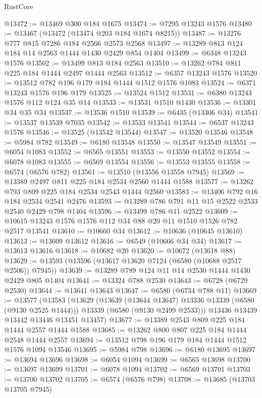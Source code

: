 \begin{lexlean}{RustCore}
\begin{coremodule}
@13472 := @13469 @300 @184 @1675
@13474 := @7295 @13243 @1576
@13480 := @13467 (@13472 (@13474 @203 @184 @1674 @8215))
@13487 := @13276 @777 @815 @7286 @184 @2566 @2573 @2568
@13497 := @13289 @813 @124 @184 @14 @2563 @1444 @1430 @2429 @854 @1404
@13499 := @6348 @13243 @1576
@13502 := @13499 @813 @184 @2563
@13510 := @13262 @784 @811 @225 @184 @1444 @2497 @1444 @2563
@13512 := @6357 @13243 @1576
@13520 := @13512 @782 @196 @179 @184 @1444 @1512 @1576 @1083
@13524 := @6371 @13243 @1576 @196 @179
@13525 := @13524 @1512
@13531 := @6380 @13243 @1576 @112 @124 @35 @14
@13533 := @13531 @1510 @1430
@13536 := @13301 @34 @35 @34
@13537 := @13536 @1510
@13539 := @6435 (@13306 @34)
@13541 := @13537 @13539 @7035
@13542 := @13533 @13541
@13544 := @6537 @13243 @1576
@13546 := @13525 (@13542 @13544)
@13547 := @13520 @13546
@13548 := @5984 @782
@13549 := @6180 @13548
@13550 := @13547 @13549
@13551 := @6054 @1083
@13552 := @6565 @13551
@13553 := @13550 @13552
@13554 := @6078 @1083
@13555 := @6569 @13554
@13556 := @13553 @13555
@13558 := @6574 (@6576 @782)
@13561 := @13510 (@13556 @13558 @7945)
@13569 := @13389 @2497 @811 @225 @184 @2534 @2560 @1444 @1588
@13577 := @13262 @793 @809 @225 @184 @2534 @2543 @1444 @2560
@13583 := @13406 @792 @16 @184 @2534 @2541 @2476
@13593 := @13289 @786 @791 @11 @15 @2522 @2533 @2540 @2429 @798 @1404
@13596 := @13499 @786 @11 @2522
@13609 := @10615 @13243 @1576 @1576 @112 @34 @88 @20 @11 @1510 @1526 @782 @2517 @13541
@13610 := @10660 @34
@13612 := @10636 (@10645 @13610)
@13613 := @13609 @13612
@13616 := @6549 (@10666 @34 @34)
@13617 := @13613 @13616
@13618 := @10682 @20
@13620 := @10672 (@13618 @88)
@13629 := @13593 (@13596 (@13617 @13620 @7124 (@6580 (@10688 @2517 @2506)) @7945))
@13639 := @13289 @789 @124 @11 @14 @2530 @1444 @1430 @2429 @805 @1404
@13641 := @13324 @788 @2530
@13643 := @6728 (@6729 @2530)
@13644 := @13641 @13643
@13647 := @6580 (@6734 @788 @11)
@13669 := @13577
    (@13583
      (@13629
        (@13639 (@13644 @13647) @13336 @13339 (@6580 (@9130 @2525 @1444)))
        @13339
        (@6580 (@9130 @2499 @2533)))
      @13436
      @13439
      @13442
      @13446
      @13451
      @13457)
@13677 := @13389 @2543 @809 @225 @184 @1444 @2557 @1444 @1588
@13685 := @13262 @800 @807 @225 @184 @1444 @2548 @1444 @2557
@13694 := @13512 @798 @196 @179 @184 @1444 @1512 @1576 @1094 @13546
@13695 := @5984 @798
@13696 := @6180 @13695
@13697 := @13694 @13696
@13698 := @6054 @1094
@13699 := @6565 @13698
@13700 := @13697 @13699
@13701 := @6078 @1094
@13702 := @6569 @13701
@13703 := @13700 @13702
@13705 := @6574 (@6576 @798)
@13708 := @13685 (@13703 @13705 @7945)

\end{coremodule}
\end{lexlean}
